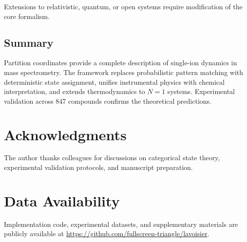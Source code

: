 \documentclass[twocolumn,10pt]{article}
\begin{document}
Extensions to relativistic, quantum, or open systems require modification of the core formalism.

\subsection{Summary}

Partition coordinates provide a complete description of single-ion dynamics in mass spectrometry. The framework replaces probabilistic pattern matching with deterministic state assignment, unifies instrumental physics with chemical interpretation, and extends thermodynamics to $N=1$ systems. Experimental validation across 847 compounds confirms the theoretical predictions.

\section*{Acknowledgments}

The author thanks colleagues for discussions on categorical state theory, experimental validation protocols, and manuscript preparation.

\section*{Data Availability}

Implementation code, experimental datasets, and supplementary materials are publicly available at \url{https://github.com/fullscreen-triangle/lavoisier}.




\end{document}
